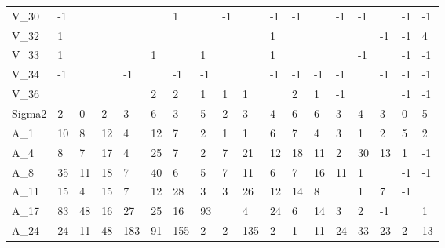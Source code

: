 \begin{tabular}{llllllllllllllllll}
V\_30   &      -1 &       &       &           &      &     1 &            &    -1 &                &         -1 &      -1 &            &         -1 &     -1 &       &   -1 &    -1 \\
V\_32   &       1 &       &       &           &      &       &            &       &                &          1 &         &            &            &        &    -1 &   -1 &     4 \\
V\_33   &       1 &       &       &           &    1 &       &          1 &       &                &          1 &         &            &            &     -1 &       &   -1 &    -1 \\
V\_34   &      -1 &       &       &        -1 &      &    -1 &         -1 &       &                &         -1 &      -1 &         -1 &         -1 &        &    -1 &   -1 &    -1 \\
V\_36   &         &       &       &           &    2 &     2 &          1 &     1 &              1 &            &       2 &          1 &         -1 &        &       &   -1 &    -1 \\
Sigma2 &       2 &     0 &     2 &         3 &    6 &     3 &          5 &     2 &              3 &          4 &       6 &          6 &          3 &      4 &     3 &    0 &     5 \\
A\_1    &      10 &     8 &    12 &         4 &   12 &     7 &          2 &     1 &              1 &          6 &       7 &          4 &          3 &      1 &     2 &    5 &     2 \\
A\_4    &       8 &     7 &    17 &         4 &   25 &     7 &          2 &     7 &             21 &         12 &      18 &         11 &          2 &     30 &    13 &    1 &    -1 \\
A\_8    &      35 &    11 &    18 &         7 &   40 &     6 &          5 &     7 &             11 &          6 &       7 &         16 &         11 &      1 &       &   -1 &    -1 \\
A\_11   &      15 &     4 &    15 &         7 &   12 &    28 &          3 &     3 &             26 &         12 &      14 &          8 &            &      1 &     7 &   -1 &       \\
A\_17   &      83 &    48 &    16 &        27 &   25 &    16 &         93 &       &              4 &         24 &       6 &         14 &          3 &      2 &    -1 &      &     1 \\
A\_24   &      24 &    11 &    48 &       183 &   91 &   155 &          2 &     2 &            135 &          2 &       1 &         11 &         24 &     33 &    23 &    2 &    13 \\

\end{tabular}
